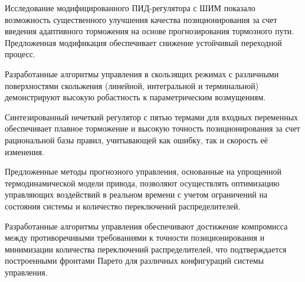 Исследование модифицированного ПИД-регулятора с ШИМ показало возможность
существенного улучшения качества позиционирования за счет
введения адаптивного торможения на основе прогнозирования тормозного пути.
Предложенная модификация обеспечивает снижение устойчивый переходной процесс.

Разработанные алгоритмы управления в скользящих режимах с различными поверхностями
скольжения (линейной, интегральной и терминальной) демонстрируют
высокую робастность к параметрическим возмущениям.

Синтезированный нечеткий регулятор с пятью термами для входных переменных
обеспечивает плавное торможение и высокую точность позиционирования за счет
рациональной базы правил, учитывающей как ошибку, так и скорость её изменения.

Предложенные методы прогнозного управления, основанные на
упрощенной термодинамической модели привода, позволяют осуществлять
оптимизацию управляющих воздействий в реальном времени
с учетом ограничений на состояния системы и количество переключений распределителей.

Разработанные алгоритмы управления обеспечивают достижение
компромисса между противоречивыми требованиями к точности позиционирования и
минимизации количества переключений распределителей, что подтверждается
построенными фронтами Парето для различных конфигураций системы управления.